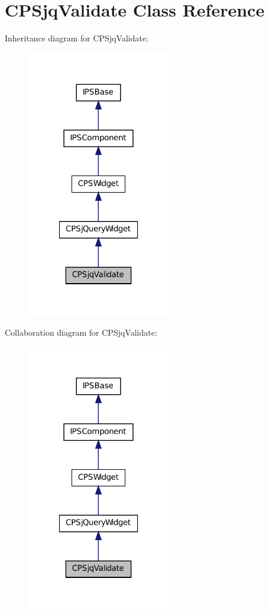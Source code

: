 \hypertarget{classCPSjqValidate}{
\section{CPSjqValidate Class Reference}
\label{classCPSjqValidate}
}


Inheritance diagram for CPSjqValidate:\nopagebreak
\begin{figure}[H]
\begin{center}
\leavevmode
\includegraphics[width=178pt]{classCPSjqValidate__inherit__graph}
\end{center}
\end{figure}


Collaboration diagram for CPSjqValidate:\nopagebreak
\begin{figure}[H]
\begin{center}
\leavevmode
\includegraphics[width=178pt]{classCPSjqValidate__coll__graph}
\end{center}
\end{figure}
